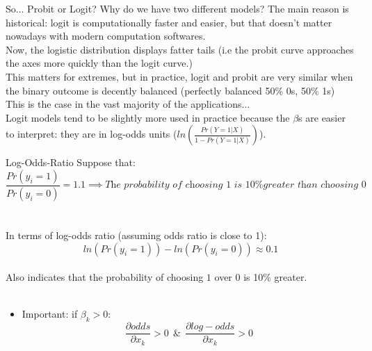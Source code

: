 \documentclass[notes,10pt, aspectratio=169]{beamer}
\begin{document}
\begin{frame}{So... Probit or Logit?}
Why do we have two different models? The main reason is historical: logit is computationally faster and easier, but that doesn't matter nowadays with modern computation softwares.\\[1em]

Now, the logistic distribution displays fatter tails (i.e the probit curve approaches the axes more quickly than the logit curve.)\\[1em]

This matters for extremes, but in practice, logit and probit are very similar when the binary outcome is decently balanced (perfectly balanced 50\% 0s, 50\% 1s)\\[1em]

This is the case in the vast majority of the applications...\\[1em]

Logit models tend to be slightly more used in practice because the $\beta$s are easier to interpret: they are in log-odds units ($ln(\frac{Pr(Y=1|X)}{1-Pr(Y=1|X)})$).\\[1em]

\end{frame}


\begin{frame}{Log-Odds-Ratio}
Suppose that:
\[
\frac{Pr(y_i=1)}{Pr(y_i=0)}=1.1 \implies \textit{The probability of choosing 1 is 10\% greater than choosing 0}
\]\\~\\
In terms of log-odds ratio (assuming odds ratio is close to 1):\\
\[
ln(Pr(y_i=1))-ln(Pr(y_i=0))\approx 0.1
\]\\
Also indicates that the probability of choosing $1$ over $0$ is 10\% greater.\\~\\
\begin{itemize}
    \item Important: if $\beta_k>0$:
    \[
    \frac{\partial odds}{\partial x_k}>0 \ \ \&  \ \ \frac{\partial log-odds }{\partial x_k}>0
    \]
\end{itemize}
\end{frame}
\end{document}

